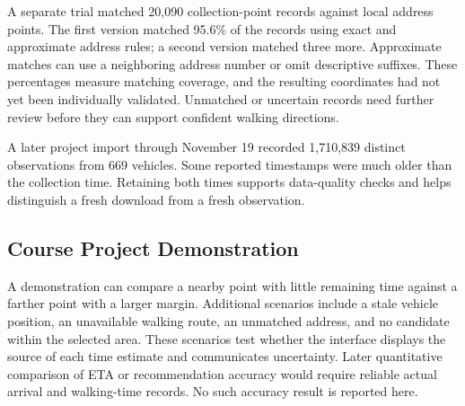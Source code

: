 A separate trial matched 20,090 collection-point records against local address points. The first version matched 95.6\% of the records using exact and approximate address rules; a second version matched three more. Approximate matches can use a neighboring address number or omit descriptive suffixes. These percentages measure matching coverage, and the resulting coordinates had not yet been individually validated. Unmatched or uncertain records need further review before they can support confident walking directions.

A later project import through November 19 recorded 1,710,839 distinct observations from 669 vehicles. Some reported timestamps were much older than the collection time. Retaining both times supports data-quality checks and helps distinguish a fresh download from a fresh observation.

\subsection{Course Project Demonstration}
A demonstration can compare a nearby point with little remaining time against a farther point with a larger margin. Additional scenarios include a stale vehicle position, an unavailable walking route, an unmatched address, and no candidate within the selected area. These scenarios test whether the interface displays the source of each time estimate and communicates uncertainty. Later quantitative comparison of ETA or recommendation accuracy would require reliable actual arrival and walking-time records. No such accuracy result is reported here.
